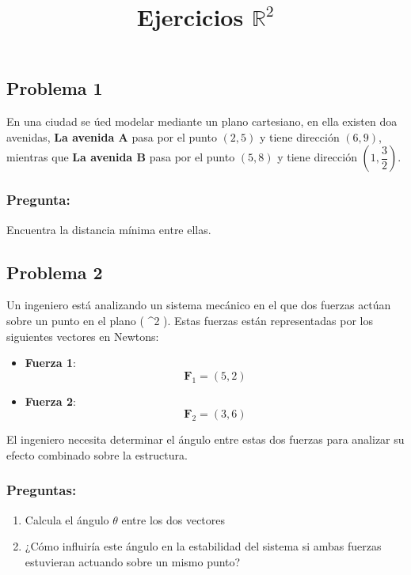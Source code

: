 \documentclass[
  letterpaper,
  DIV=11,
  numbers=noendperiod]{scrartcl}
\title{Ejercicios \(\mathbb{R}^2\)}
\author{}
\date{}
\providecommand{\tightlist}{%
  \setlength{\itemsep}{0pt}\setlength{\parskip}{0pt}}\usepackage{longtable,booktabs,array}
\begin{document}
\maketitle


\subsection{\texorpdfstring{\textbf{Problema
1}}{Problema 1}}\label{problema-1}

En una ciudad se úed modelar mediante un plano cartesiano, en ella
existen doa avenidas, \textbf{La avenida A} pasa por el punto \((2,5)\)
y tiene dirección \((6,9)\), mientras que \textbf{La avenida B} pasa por
el punto \((5,8)\) y tiene dirección \((1,\dfrac{3}{2})\).

\subsubsection{\texorpdfstring{\textbf{Pregunta:}}{Pregunta:}}\label{pregunta}

Encuentra la distancia mínima entre ellas.

\subsection{\texorpdfstring{\textbf{Problema
2}}{Problema 2}}\label{problema-2}

Un ingeniero está analizando un sistema mecánico en el que dos fuerzas
actúan sobre un punto en el plano ( \^{}2 ). Estas fuerzas
están representadas por los siguientes vectores en Newtons:

\begin{itemize}
\tightlist
\item
  \textbf{Fuerza 1}:\\
  \[
  \mathbf{F}_1 = (5, 2)
  \]
\item
  \textbf{Fuerza 2}:\\
  \[
  \mathbf{F}_2 = (3, 6)
  \]
\end{itemize}

El ingeniero necesita determinar el ángulo entre estas dos fuerzas para
analizar su efecto combinado sobre la estructura.

\subsubsection{\texorpdfstring{\textbf{Preguntas:}}{Preguntas:}}\label{preguntas}

\begin{enumerate}
\def\labelenumi{\alph{enumi}.}
\tightlist
\item
  Calcula el ángulo \(\theta\) entre los dos vectores
\item
  ¿Cómo influiría este ángulo en la estabilidad del sistema si ambas
  fuerzas estuvieran actuando sobre un mismo punto?
\end{enumerate}
\end{document}
